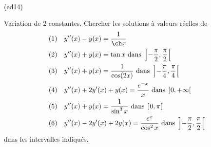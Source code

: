 \begin{tiny}(ed14)\end{tiny} Variation de $2$ constantes.\newline
Chercher les solutions à valeurs réelles de
\begin{align*}
&(1)& &y''(x) - y(x) = \frac{1}{\ch x} \\
&(2)& &y''(x) + y(x) = \tan x \text{ dans } \left] -\frac{\pi}{2}, \frac{\pi}{2}\right[  \\
&(3)& &y''(x) + y(x) = \frac{1}{\cos(2x)} \text{ dans } \left] -\frac{\pi}{4}, \frac{\pi}{4}\right[  \\
&(4)& &y''(x) + 2y'(x) + y(x) = \frac{e^{-x}}{x} \text{ dans } \left] 0, +\infty\right[\\
&(5)& &y''(x) + y(x) = \frac{1}{\sin^3x} \text{ dans } \left] 0, \pi\right[ \\
&(6)& &y''(x)-2y'(x)+ 2y(x) = \frac{e^x}{\cos^2x} \text{ dans } \left] -\frac{\pi}{2}, \frac{\pi}{2}\right[
\end{align*}
dans les intervalles indiqués.
